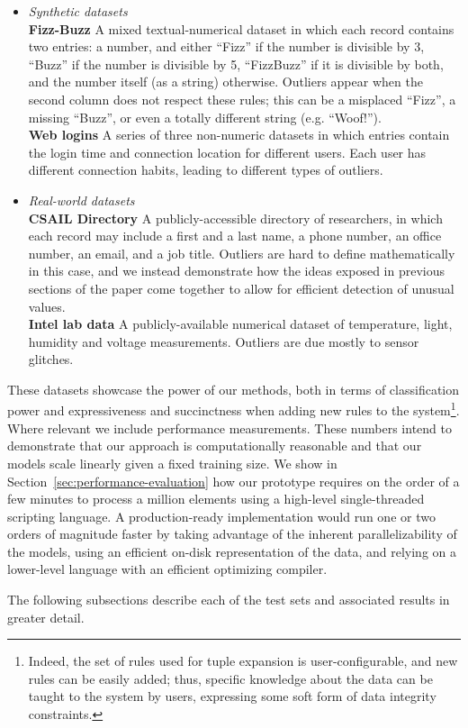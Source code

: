 \begin{itemize}
\item \emph{Synthetic datasets}\\
  \textbf{Fizz-Buzz} A mixed textual-numerical dataset in which each record contains two entries: a number, and either ``Fizz'' if the number is divisible by 3, ``Buzz'' if the number is divisible by 5, ``FizzBuzz'' if it is divisible by both, and the number itself (as a string) otherwise. Outliers appear when the second column does not respect these rules; this can be a misplaced ``Fizz'', a missing ``Buzz'', or even a totally different string (e.g. ``Woof!'').\\
  \textbf{Web logins} A series of three non-numeric datasets in which entries contain the login time and connection location for different users. Each user has different connection habits, leading to different types of outliers.
\item \emph{Real-world datasets}\\
  \textbf{CSAIL Directory} A publicly-accessible directory of researchers, in which each record may include a first and a last name, a phone number, an office number, an email, and a job title. Outliers are hard to define mathematically in this case, and we instead demonstrate how the ideas exposed in previous sections of the paper come together to allow for efficient detection of unusual values.\\
  \textbf{Intel lab data} A publicly-available numerical dataset of temperature, light, humidity and voltage measurements. Outliers are due mostly to sensor glitches.
\end{itemize}

These datasets showcase the power of our methods, both in terms of classification power and expressiveness and succinctness when adding new rules to the system\footnote{Indeed, the set of rules used for tuple expansion is user-configurable, and new rules can be easily added; thus, specific knowledge about the data can be taught to the system by users, expressing some soft form of data integrity constraints.}. Where relevant we include performance measurements. These numbers intend to demonstrate that our approach is computationally reasonable and that our models scale linearly given a fixed training size. We show in Section~\ref{sec:performance-evaluation} how our prototype requires on the order of a few minutes to process a million elements using a high-level single-threaded scripting language. A production-ready implementation would run one or two orders of magnitude faster by taking advantage of the inherent parallelizability of the models, using an efficient on-disk representation of the data, and relying on a lower-level language with an efficient optimizing compiler.

The following subsections describe each of the test sets and associated results in greater detail.






%
%
